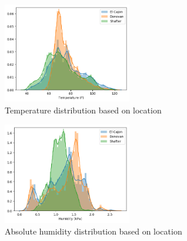 \documentclass[journal abbreviation, manuscript]{copernicus}
\newcommand\todo[1]{\textcolor{red}{#1}}
\begin{document}



\iffalse

\begin{figure}[H]
\centering
\includegraphics[width=0.5\textwidth]{results/distributions/temperature.png}
\caption{Temperature distribution based on
location}
\label{fig:temperature}
\end{figure}

\begin{figure}[H]
\centering
\includegraphics[width=0.5\textwidth]{results/distributions/humidity.png}
\caption{Absolute humidity distribution based on
location}
\label{fig:humidity}
\end{figure}
\end{document}
